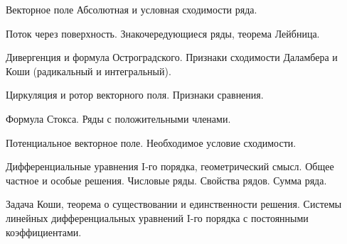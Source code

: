 \documentclass[
	14pt,
	a4paper,
	]
	{scrartcl}
\begin{document}
\shapk
{}
\setcounter{zad}{0}

\vfill
\z Векторное поле
 \vfill
\z Абсолютная и условная сходимости ряда.
 \vfill

\vfill

\newpage


\shapk
{}
\setcounter{zad}{0}

\vfill
\z Поток через поверхность.
 \vfill
\z Знакочередующиеся ряды, теорема Лейбница.
 \vfill

\vfill

\newpage


\shapk
{}
\setcounter{zad}{0}

\vfill
\z Дивергенция и формула Остроградского.
 \vfill
\z Признаки сходимости Даламбера и Коши (радикальный и интегральный).
 \vfill

\vfill

\newpage


\shapk
{}
\setcounter{zad}{0}

\vfill
\z Циркуляция и ротор векторного поля.
 \vfill
\z Признаки сравнения.
 \vfill

\vfill

\newpage


\shapk
{}
\setcounter{zad}{0}

\vfill
\z Формула Стокса.
 \vfill
\z Ряды с положительными членами.
 \vfill

\vfill

\newpage


\shapk
{}
\setcounter{zad}{0}

\vfill
\z Потенциальное векторное поле.
 \vfill
\z Необходимое условие сходимости.
 \vfill

\vfill

\newpage


\shapk
{}
\setcounter{zad}{0}

\vfill
\z Дифференциальные уравнения I-го порядка, геометрический смысл. Общее частное и особые решения.
 \vfill
\z Числовые ряды. Свойства рядов. Сумма ряда.
 \vfill

\vfill

\newpage


\shapk
{}
\setcounter{zad}{0}

\vfill
\z Задача Коши, теорема о существовании и единственности решения.
 \vfill
\z Системы линейных дифференциальных уравнений I-го порядка с постоянными коэффициентами.
 \vfill
\end{document}
